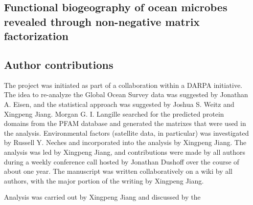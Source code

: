 \begin{refsection}
\chapter{Functional biogeography of ocean microbes revealed through non-negative matrix factorization}


\section{Author contributions}

The project was initiated as part of a collaboration within a DARPA initiative. The idea to re-analyze the Global Ocean Survey data was suggested by Jonathan A. Eisen, and the statistical approach was suggested by Joshua S. Weitz and Xingpeng Jiang. Morgan G. I. Langille searched for the predicted protein domains from the PFAM database and generated the matrixes that were used in the analysis. Environmental factors (satellite data, in particular) was investigated by Russell Y. Neches and incorporated into the analysis by Xingpeng Jiang. The analysis was led by Xingpeng Jiang, and contributions were made by all authors during a weekly conference call hosted by Jonathan Dushoff over the course of about one year. The manuscript was written collaboratively on a wiki by all authors, with the major portion of the writing by Xingpeng Jiang.

Analysis was carried out by Xingpeng Jiang and discussed by the 










\printbibliography[heading=subbibliography]



\end{refsection}